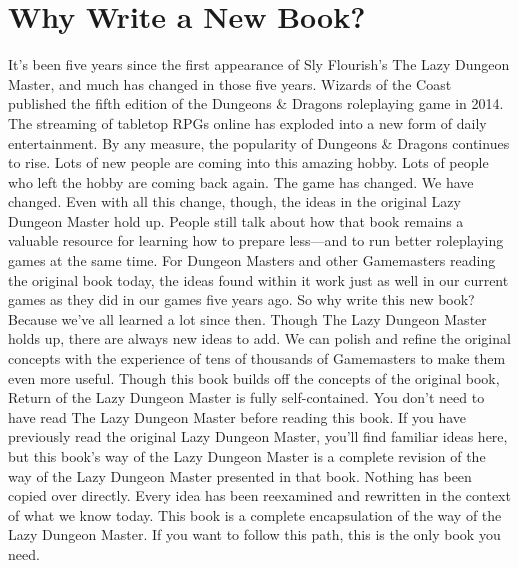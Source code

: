 \documentclass[10pt,a4paper,twoside,bg=print,twocolumn,openany,nodeprecatedcode]{dndbook}
\begin{document}
\section{Why Write a New Book?}
It's been five years since the first appearance of Sly Flourish's The Lazy Dungeon Master, and much has changed in those five years. Wizards of the Coast published the fifth edition of the Dungeons \& Dragons roleplaying game in 2014. The streaming of tabletop RPGs online has exploded into a new form of daily entertainment. By any measure, the popularity of Dungeons \& Dragons continues to rise.
Lots of new people are coming into this amazing hobby. Lots of people who left the hobby are coming back again. The game has changed. We have changed.
Even with all this change, though, the ideas in the original Lazy Dungeon Master hold up. People still talk about how that book remains a valuable resource for learning how to prepare less—and to run better roleplaying games at the same time. For Dungeon Masters and other Gamemasters reading the original book today, the ideas found within it work just as well in our current games as they did in our games five years ago.
So why write this new book?
Because we've all learned a lot since then.
Though The Lazy Dungeon Master holds up, there are always new ideas to add. We can polish and refine the original concepts with the experience of tens of thousands of Gamemasters to make them even more useful.
Though this book builds off the concepts of the original book, Return of the Lazy Dungeon Master is fully self-contained. You don't need to have read The Lazy Dungeon Master before reading this book. If you have previously read the original Lazy Dungeon Master, you'll find familiar ideas here, but this book's way of the Lazy Dungeon Master is a complete revision of the way of the Lazy Dungeon Master presented in that book. Nothing has been copied over directly. Every idea has been reexamined and rewritten in the context of what we know today.
This book is a complete encapsulation of the way of the Lazy Dungeon Master. If you want to follow this path, this is the only book you need.
\end{document}
